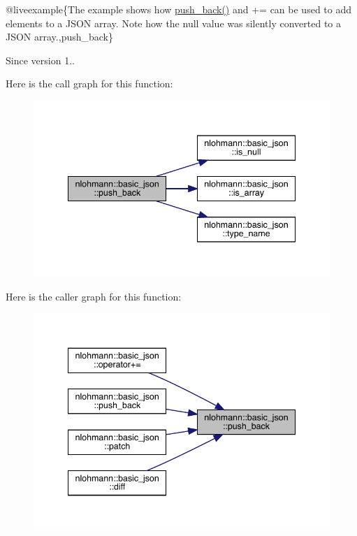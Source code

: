 @liveexample\{The example shows how {\ttfamily \mbox{\hyperlink{classnlohmann_1_1basic__json_ac8e523ddc8c2dd7e5d2daf0d49a9c0d7}{push\+\_\+back()}}} and {\ttfamily +=} can be used to add elements to a J\+S\+ON array. Note how the {\ttfamily null} value was silently converted to a J\+S\+ON array.,push\+\_\+back\}

\begin{DoxySince}{Since}
version 1.. 
\end{DoxySince}
Here is the call graph for this function\+:
\nopagebreak
\begin{figure}[H]
\begin{center}
\leavevmode
\includegraphics[width=341pt]{classnlohmann_1_1basic__json_ac8e523ddc8c2dd7e5d2daf0d49a9c0d7_cgraph}
\end{center}
\end{figure}
Here is the caller graph for this function\+:
\nopagebreak
\begin{figure}[H]
\begin{center}
\leavevmode
\includegraphics[width=341pt]{classnlohmann_1_1basic__json_ac8e523ddc8c2dd7e5d2daf0d49a9c0d7_icgraph}
\end{center}
\end{figure}
